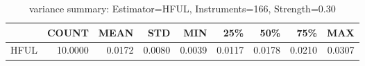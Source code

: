 \begin{table}[ht]
\centering
\caption{variance summary: Estimator=HFUL, Instruments=166, Strength=0.30}
\begin{tabular}{lrrrrrrrr}
\toprule
 & COUNT & MEAN & STD & MIN & 25\% & 50\% & 75\% & MAX \\
\midrule
HFUL & 10.0000 & 0.0172 & 0.0080 & 0.0039 & 0.0117 & 0.0178 & 0.0210 & 0.0307 \\
\bottomrule
\end{tabular}
\end{table}

